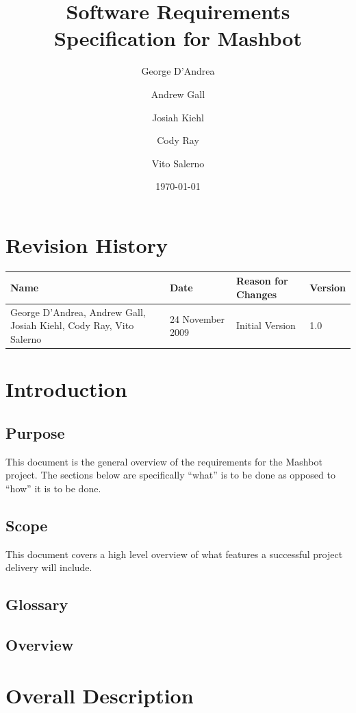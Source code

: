 \documentclass{report}
\begin{document}
\title{Software Requirements Specification for Mashbot} 
\author{George D'Andrea \and Andrew Gall \and Josiah Kiehl \and
  Cody Ray \and Vito Salerno}
\date{\today}
\begin{titlepage}
\maketitle
\end{titlepage}

\section*{Revision History}
\begin{tabular}{|p{2in}|l|l|l|}
          \hline
          \textbf{Name} & \textbf{Date} & \textbf{Reason for Changes} & \textbf{Version} \\
          \hline \hline
          George D'Andrea, Andrew Gall, Josiah Kiehl, Cody Ray, Vito
          Salerno & 24 November 2009 & Initial Version & 1.0 \\
          \hline
        \end{tabular}


\tableofcontents

\section{Introduction}

\subsection{Purpose} %
This document is the general overview of the requirements for the Mashbot 
project.  The sections below are specifically ``what'' is to be done as opposed 
to ``how'' it is to be done.
\subsection{Scope} %
This document covers a high level overview of what features a successful project 
delivery will include.
\subsection{Glossary} %
\subsection{Overview} %

\section{Overall Description}
\end{document}
